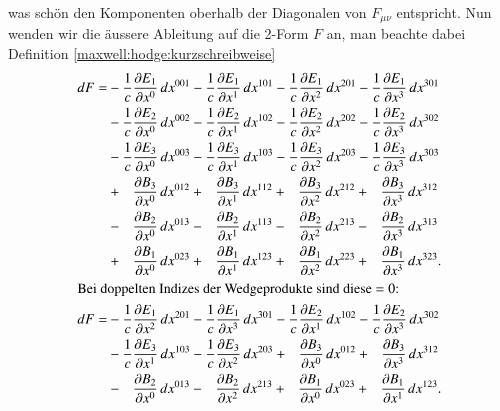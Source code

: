was schön den Komponenten oberhalb der Diagonalen von $F_{\mu\nu}$ entspricht.
Nun wenden wir die äussere Ableitung auf die 2-Form $F$ an, man beachte dabei Definition \ref{maxwell:hodge:kurzschreibweise}
 \begin{align*}	
 	dF =
 	& -  \frac{1}{c} \frac{\d E_1}{\d x^0} \, dx^{001} - \frac{1}{c} \frac{\d E_1}{\d x^1} \, dx^{101}
 	- \frac{1}{c} \frac{\d E_1}{\d x^2} \, dx^{201} - \frac{1}{c} \frac{\d E_1}{\d x^3} \, dx^{301}
 	\\
 	&- \frac{1}{c} \frac{\d E_2}{\d x^0} \, dx^{002} - \frac{1}{c} \frac{\d E_2}{\d x^1} \, dx^{102}
 	 - \frac{1}{c} \frac{\d E_2}{\d x^2} \, dx^{202} - \frac{1}{c} \frac{\d E_2}{\d x^3} \, dx^{302}
 	\\
 	& - \frac{1}{c} \frac{\d E_3}{\d x^0} \, dx^{003} - \frac{1}{c} \frac{\d E_3}{\d x^1} \, dx^{103}
 	- \frac{1}{c} \frac{\d E_3}{\d x^2} \, dx^{203} - \frac{1}{c} \frac{\d E_3}{\d x^3} \, dx^{303}
 	\\
 	&+ \phantom{\frac{1}{c}}\frac{\d B_3}{\d x^0} \, dx^{012} + \phantom{\frac{1}{c}}\frac{\d B_3}{\d x^1} \, dx^{112}
 	+ \phantom{\frac{1}{c}}\frac{\d B_3}{\d x^2} \, dx^{212} + \phantom{\frac{1}{c}}\frac{\d B_3}{\d x^3} \, dx^{312}
 	\\
 	&- \phantom{\frac{1}{c}}\frac{\d B_2}{\d x^0} \, dx^{013} - \phantom{\frac{1}{c}}\frac{\d B_2}{\d x^1} \, dx^{113}
 	- \phantom{\frac{1}{c}}\frac{\d B_2}{\d x^2} \, dx^{213} - \phantom{\frac{1}{c}}\frac{\d B_2}{\d x^3} \, dx^{313}
 	\\
 	&+ \phantom{\frac{1}{c}}\frac{\d B_1}{\d x^0} \, dx^{023} + \phantom{\frac{1}{c}}\frac{\d B_1}{\d x^1} \, dx^{123}
 	+ \phantom{\frac{1}{c}}\frac{\d B_1}{\d x^2} \, dx^{223} + \phantom{\frac{1}{c}}\frac{\d B_1}{\d x^3} \, dx^{323} .
 	\\
	\intertext{Bei doppelten Indizes der Wedgeprodukte sind diese $=0$:}
	dF
 	=
 	&- \frac{1}{c} \frac{\d E_1}{\d x^2} \, dx^{201} - \frac{1}{c} \frac{\d E_1}{\d x^3} \, dx^{301}
 	 - \frac{1}{c} \frac{\d E_2}{\d x^1} \, dx^{102} - \frac{1}{c} \frac{\d E_2}{\d x^3} \, dx^{302}
 	\\
 	&- \frac{1}{c} \frac{\d E_3}{\d x^1} \, dx^{103} - \frac{1}{c} \frac{\d E_3}{\d x^2} \, dx^{203}
 	 + \phantom{\frac{1}{c}} \frac{\d B_3}{\d x^0} \, dx^{012} + \phantom{\frac{1}{c}} \frac{\d B_3}{\d x^3} \, dx^{312}
 	\\
 	&- \phantom{\frac{1}{c}} \frac{\d B_2}{\d x^0} \, dx^{013} - \phantom{\frac{1}{c}} \frac{\d B_2}{\d x^2} \, dx^{213}
 	 + \phantom{\frac{1}{c}} \frac{\d B_1}{\d x^0} \, dx^{023} + \phantom{\frac{1}{c}} \frac{\d B_1}{\d x^1} \, dx^{123} .  

\end{align*}
